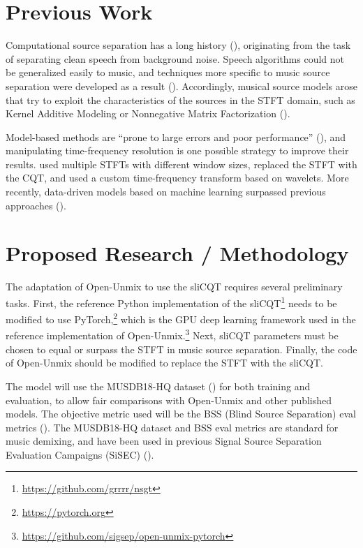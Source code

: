 \documentclass[letter,12pt]{article}
\begin{document}
\section{Previous Work}

Computational source separation has a long history (\cite{musicsepgood}), originating from the task of separating clean speech from background noise. Speech algorithms could not be generalized easily to music, and techniques more specific to music source separation were developed as a result (\cite{musicseptechniques1}). Accordingly, musical source models arose that try to exploit the characteristics of the sources in the STFT domain, such as Kernel Additive Modeling or Nonnegative Matrix Factorization (\cite{musicsepgood}).

Model-based methods are ``prone to large errors and poor performance'' (\cite[13]{musicsepintro1}), and manipulating time-frequency resolution is one possible strategy to improve their results. \textcite{driedger} used multiple STFTs with different window sizes, \textcite{fitzgerald2} replaced the STFT with the CQT, and \textcite{wavelets} used a custom time-frequency transform based on wavelets. More recently, data-driven models based on machine learning surpassed previous approaches (\cite{sisec2018, musicsepintro1}).

\section{Proposed Research / Methodology}

The adaptation of Open-Unmix to use the sliCQT requires several preliminary tasks. First, the reference Python implementation of the sliCQT\footnote{\url{https://github.com/grrrr/nsgt}} needs to be modified to use PyTorch,\footnote{\url{https://pytorch.org}} which is the GPU deep learning framework used in the reference implementation of Open-Unmix.\footnote{\url{https://github.com/sigsep/open-unmix-pytorch}} Next, sliCQT parameters must be chosen to equal or surpass the STFT in music source separation. Finally, the code of Open-Unmix should be modified to replace the STFT with the sliCQT.

The model will use the MUSDB18-HQ dataset (\cite{musdb18hq}) for both training and evaluation, to allow fair comparisons with Open-Unmix and other published models. The objective metric used will be the BSS (Blind Source Separation) eval metrics (\cite{bss}). The MUSDB18-HQ dataset and BSS eval metrics are standard for music demixing, and have been used in previous Signal Source Separation Evaluation Campaigns (SiSEC) (\cite{sisec2018}).
\end{document}
